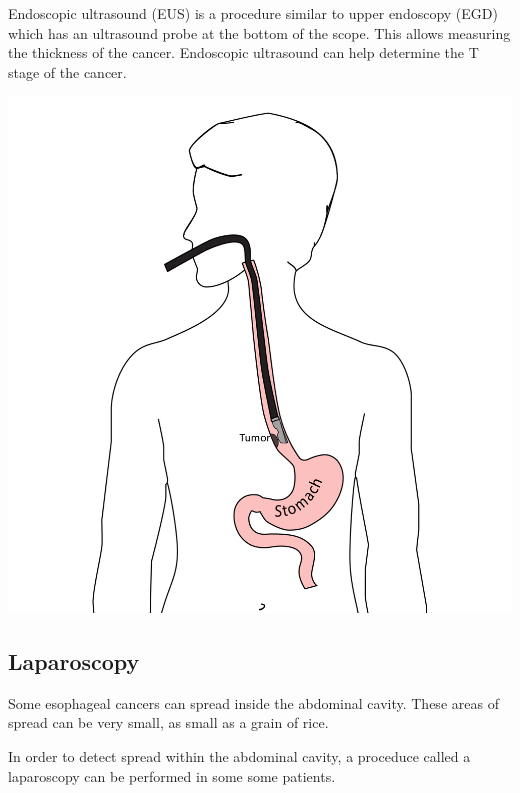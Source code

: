 \documentclass[
  letterpaper,
  DIV=11,
  numbers=noendperiod]{scrartcl}
\begin{document}
Endoscopic ultrasound (EUS) is a procedure similar to upper endoscopy
(EGD) which has an ultrasound probe at the bottom of the scope. This
allows measuring the thickness of the cancer. Endoscopic ultrasound can
help determine the T stage of the cancer.

\includegraphics{christmas2004_files/mediabag/EUSArtboard.png}

\subsection{Laparoscopy}\label{laparoscopy}

Some esophageal cancers can spread inside the abdominal cavity. These
areas of spread can be very small, as small as a grain of rice.

In order to detect spread within the abdominal cavity, a proceduce
called a laparoscopy can be performed in some some patients.
\end{document}

